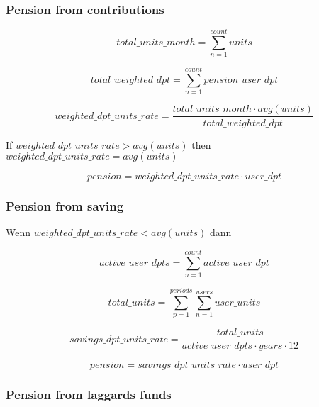 \subsubsection*{Pension from contributions}

\begin{equation*}
	total\_units\_month = 
	\sum_{n=1}^{count} units
\end{equation*}

\begin{equation*}
	total\_weighted\_dpt = 
	\sum_{n=1}^{count} pension\_user\_dpt
\end{equation*}

\begin{equation*}
	weighted\_dpt\_units\_rate = 	
	\frac{total\_units\_month  \cdot avg(units)} 
	{total\_weighted\_dpt}		
\end{equation*}

If $weighted\_dpt\_units\_rate > avg(units)$ then $weighted\_dpt\_units\_rate = avg(units)$
        

\begin{equation*}
	pension = 	
	weighted\_dpt\_units\_rate \cdot user\_dpt
\end{equation*}


\subsubsection*{Pension from saving}

Wenn $weighted\_dpt\_units\_rate < avg(units)$ dann 

\begin{equation*}
	active\_user\_dpts = 
	\sum_{n=1}^{count} active\_user\_dpt
\end{equation*}

\begin{equation*}
	total\_units = 	
	\sum_{p=1}^{periods} \sum_{n=1}^{users} user\_units	
\end{equation*}

\begin{equation*}
	savings\_dpt\_units\_rate = 	
	\frac{total\_units} 
	{active\_user\_dpts \cdot years \cdot 12}		
\end{equation*}

\begin{equation*}
	pension = savings\_dpt\_units\_rate \cdot user\_dpt
\end{equation*}


\subsubsection*{Pension from laggards funds}

